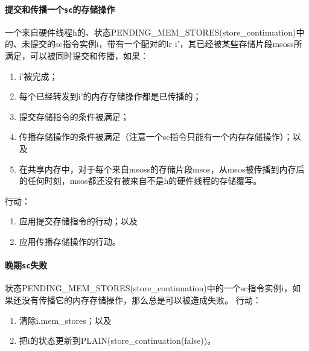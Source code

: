 \paragraph{提交和传播一个{\tt sc}的存储操作}\label{omm:commit_sc}
一个来自硬件线程h的、状态PENDING_MEM_STORES(store_continuation)中的、未提交的sc指令实例i，带有一个配对的lr i’，其已经被某些存储片段msoss所满足，可以被同时提交和传播，如果：
\begin{enumerate}
\item i’被完成； %
\item 每个已经转发到i’的内存存储操作都是已传播的； %
\item 提交存储指令的条件被满足； %
\item 传播存储操作的条件被满足（注意一个sc指令只能有一个内存存储操作）；以及  %
\item 在共享内存中，对于每个来自msoss的存储片段msos，从msos被传播到内存后的任何时刻，msos都还没有被来自不是h的硬件线程的存储覆写。  %
\end{enumerate}
行动：
\begin{enumerate}
\item 应用提交存储指令的行动；以及  %
\item 应用传播存储操作的行动。  %
\end{enumerate}


\paragraph{晚期{\tt sc}失败}\label{omm:late_sc_fail}
状态PENDING_MEM_STORES(store_continuation)中的一个sc指令实例i，如果还没有传播它的内存存储操作，那么总是可以被造成失败。
行动：
\begin{enumerate}
\item 清除i.mem_stores；以及 %
\item 把i的状态更新到PLAIN(store_continuation(false))。  %
\end{enumerate}


